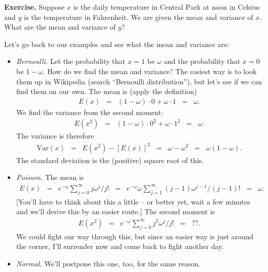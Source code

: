 \documentclass[11pt]{article}
\begin{document}
{\bf Exercise.\/} Suppose $x$ is the daily temperature in Central Park at noon in Celsius
and $y$ is the temperature in Fahrenheit.
We are given the mean and variance of $x$.  What are the mean and variance of $y$?



Let's go back to our examples and see what the mean and variance are:
%
\begin{itemize}
\item {\it Bernoulli.\/}
Let the probability that $x=1$ be $\omega$ and the probability that $x=0$ be $1-\omega$.
How do we find the mean and variance?
The easiest way is to look them up in Wikipedia (search ``Bernoulli distribution''),
but let's see if we can find them on our own.
The mean is (apply the definition)
\begin{eqnarray*}
    E(x) &=&  (1-\omega) \cdot 0 + \omega \cdot 1
            \;\;=\;\; \omega.
\end{eqnarray*}
We find the variance from the second moment:
\begin{eqnarray*}
    E(x^2) &=&  (1-\omega) \cdot 0^2 + \omega \cdot 1^2
            \;\;=\;\; \omega.
\end{eqnarray*}
The variance is therefore
\begin{eqnarray*}
    \mbox{Var}(x) &=& E(x^2) - [E(x)]^2
            \;\;=\;\;  \omega - \omega^2
            \;\;=\;\; \omega (1-\omega) .
\end{eqnarray*}
The standard deviation is the (positive) square root of this.


\item {\it Poisson.\/}
The mean is
\begin{eqnarray*}
    E(x) &=& e^{-\omega} \sum_{j=0}^\infty j \omega^j/j!
            \;\;=\;\; e^{-\omega} \omega \sum_{j=1}^\infty (j-1) \omega^{j-1}/(j-1)!
            \;\;=\;\; \omega .
\end{eqnarray*}
[You'll have to think about this a little -- or better yet, wait a few minutes and
we'll derive this by an easier route.]
The second moment is
\begin{eqnarray*}
    E(x^2) &=& e^{-\omega} \sum_{j=0}^\infty j^2 \omega^j/j!
            \;\;=\;\;  ??.
\end{eqnarray*}
We could fight our way through this,
but since an easier way is just around the corner,
I'll surrender now and come back to fight another day.


\item {\it Normal.\/}
We'll postpone this one, too, for the same reason.
\end{itemize}
\end{document}
